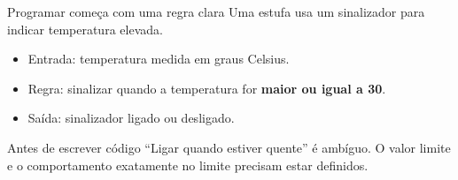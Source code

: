 \begin{frame}[t]{Programar começa com uma regra clara}
Uma estufa usa um sinalizador para indicar temperatura elevada.
\begin{itemize}
\item Entrada: temperatura medida em graus Celsius.
\item Regra: sinalizar quando a temperatura for \textbf{maior ou igual a 30}.
\item Saída: sinalizador ligado ou desligado.
\end{itemize}
\begin{alertblock}{Antes de escrever código}
``Ligar quando estiver quente'' é ambíguo. O valor limite e o comportamento exatamente no limite precisam estar definidos.
\end{alertblock}
\end{frame}
